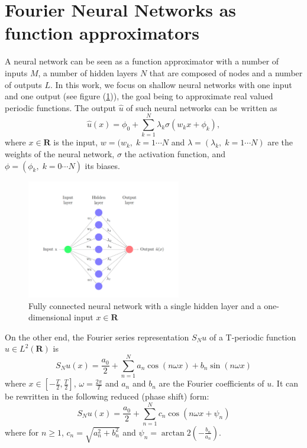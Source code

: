 \documentclass[AMS,STIX1COL]{WileyNJD-v2}
\begin{document}
\section{Fourier Neural Networks as function approximators}\label{sec:fnn}
A neural network can be seen as a function approximator with a number of inputs $M$, a number of hidden layers $N$ that are composed of nodes and a number of outputs $L$. In this work, we focus on shallow neural networks with one input and one output (see figure (\ref{fig:NN_single})), the goal being to approximate real valued periodic functions. The output $\hat{u}$ of such neural networks  can be written as
\begin{equation}\label{Eq: NN1d}
  \hat{u}(x) = \phi_0 + \sum_{k = 1}^N \lambda_{k} \sigma\left( w_{k}x + \phi_k \right),
\end{equation}
where $x  \in \mathbf{R}$ is the input, $w = (w_{k},\; k=1\cdots N$ and $\lambda = (\lambda_k,\; k=1\cdots N)$ are the weights of the neural network, $\sigma$ the activation function, and $\phi = (\phi_k,\; k=0\cdots N)$ its biases. 
\begin{figure}[htb]
    \centering
    \includegraphics[width=0.6\textwidth]{nn1.pdf}
    \caption{\;Fully connected neural network with a single hidden layer and a one-dimensional input $x \in \mathbf{R}$}
    \label{fig:NN_single}
\end{figure}


On the other end, the Fourier series representation $S_N u$ of a T-periodic function $u \in L^2(\mathbf R)$ is
\begin{equation}\label{Eq: fourier}
    S_{N}u(x) = \frac{a_0}{2} + \sum_{n=1}^N a_{n} \cos(n \omega  x) + b_{n} \sin(n \omega  x) 
\end{equation}
where $x \in [-\frac{T}{2}, \frac{T}{2}]$, $\omega = \frac{2\pi}{T}$ and $a_{n}$ and $b_{n}$ are the Fourier coefficients of $u$. It can be rewritten in the following reduced (phase shift) form:
 \begin{equation}\label{Eq: fourier_shift}
     S_N u(x) = \frac{a_0}{2} + \sum_{n=1}^N c_{n} \cos(n \omega  x + \psi_{n})
 \end{equation}
where for $n \geq 1$, $c_{n} = \sqrt{a_{n}^2 + b_{n}^2}$ and $\psi_n = \arctan2(-\frac{b_{n}}{a_{n}})$. 
\end{document}
